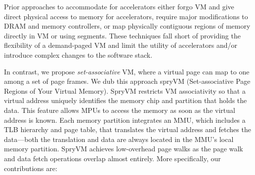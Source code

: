 
Prior approaches to accommodate for accelerators either forgo VM and give direct physical access to memory for accelerators\cite{}, require major modifications to DRAM and memory controllers, or map physically contiguous regions of memory directly in VM or using segments\cite{}. These techniques fall short of providing the flexibility of a demand-paged VM and limit the utility of accelerators and/or introduce complex changes to the software stack.



In contrast, we propose {\it set-associative} VM, where a virtual page can map to one among a set of page frames. We dub this approach spryVM (Set-associative Page Regions of Your Virtual Memory). SpryVM restricts VM associativity so that a virtual address uniquely identifies the memory chip and partition that holds the data. This feature allows MPUs to access the memory as soon as the virtual address is known. Each memory partition integrates an MMU, which includes a TLB hierarchy and page table, that translates the virtual address and fetches the data---both the translation and data are always located in the MMU's local memory partition. SpryVM achieves low-overhead page walks as the page walk and data fetch operations overlap almost entirely. More specifically, our contributions are:

